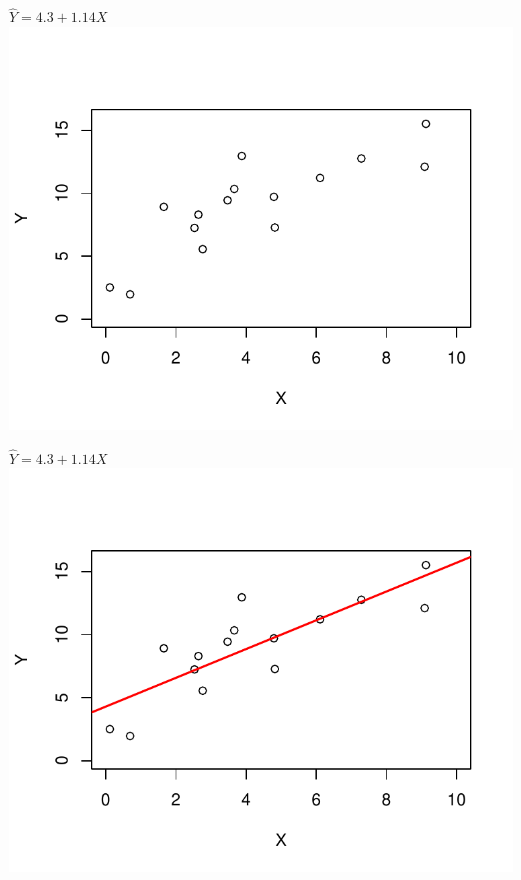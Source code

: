 \documentclass{beamer}\usepackage[]{graphicx}\usepackage[]{color}
\newenvironment{knitrout}{}{} %
\renewenvironment{knitrout}{\setlength{\topsep}{0mm}}{}
\begin{document}
\begin{frame}
\centering
$ \hat Y = 4.3 + 1.14X$
\vfill
\begin{knitrout}
\color{fgcolor}
\includegraphics[width=0.8\linewidth]{figure/plotexample1-1} 

\end{knitrout}

\end{frame}

\begin{frame}
\centering
$ \hat Y = 4.3 + 1.14X$
\vfill
\begin{knitrout}
\color{fgcolor}
\includegraphics[width=0.8\linewidth]{figure/plotexample2-1} 

\end{knitrout}

\end{frame}
\end{document}
